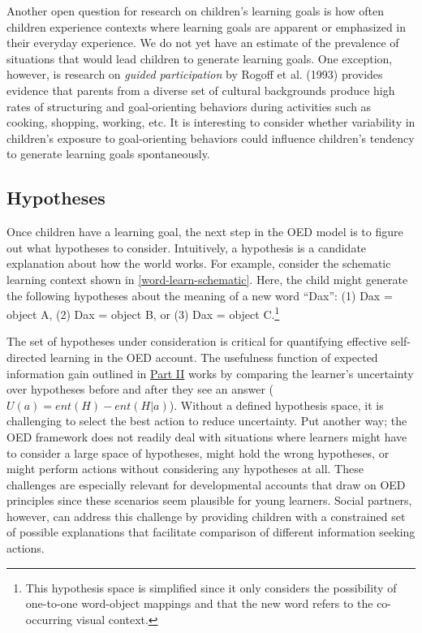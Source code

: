 \documentclass[oneside]{report}
\begin{document}
Another open question for research on children's learning goals is how
often children experience contexts where learning goals are apparent or
emphasized in their everyday experience. We do not yet have an estimate
of the prevalence of situations that would lead children to generate
learning goals. One exception, however, is research on \emph{guided
participation} by Rogoff et al. (1993) provides evidence that parents
from a diverse set of cultural backgrounds produce high rates of
structuring and goal-orienting behaviors during activities such as
cooking, shopping, working, etc. It is interesting to consider whether
variability in children's exposure to goal-orienting behaviors could
influence children's tendency to generate learning goals spontaneously.

\subsection{Hypotheses}\label{hypotheses}

Once children have a learning goal, the next step in the OED model is to
figure out what hypotheses to consider. Intuitively, a hypothesis is a
candidate explanation about how the world works. For example, consider
the schematic learning context shown in \ref{word-learn-schematic}.
Here, the child might generate the following hypotheses about the
meaning of a new word ``Dax'': (1) Dax = object A, (2) Dax = object B,
or (3) Dax = object C.\footnote{This hypothesis space is simplified
  since it only considers the possibility of one-to-one word-object
  mappings and that the new word refers to the co-occurring visual
  context.}

The set of hypotheses under consideration is critical for quantifying
effective self-directed learning in the OED account. The usefulness
function of expected information gain outlined in
\protect\hyperlink{oed}{Part II} works by comparing the learner's
uncertainty over hypotheses before and after they see an answer
(\(U(a) = ent(H) - ent(H|a)\)). Without a defined hypothesis space, it
is challenging to select the best action to reduce uncertainty. Put
another way; the OED framework does not readily deal with situations
where learners might have to consider a large space of hypotheses, might
hold the wrong hypotheses, or might perform actions without considering
any hypotheses at all. These challenges are especially relevant for
developmental accounts that draw on OED principles since these scenarios
seem plausible for young learners. Social partners, however, can address
this challenge by providing children with a constrained set of possible
explanations that facilitate comparison of different information seeking
actions.
\end{document}
